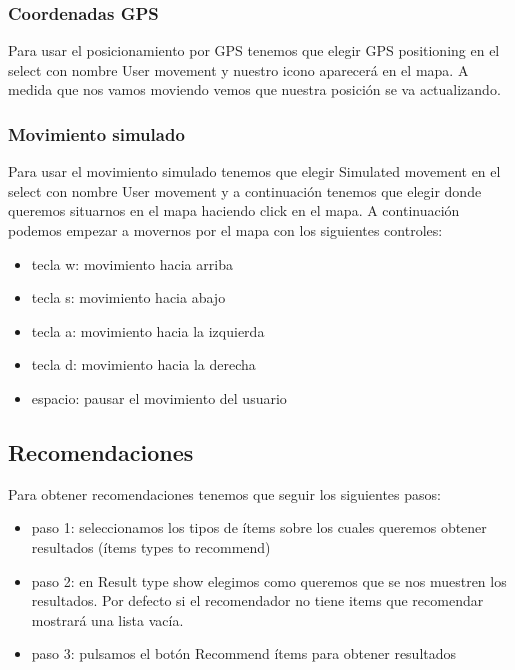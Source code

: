 \subsubsection{Coordenadas GPS}

Para usar el posicionamiento por GPS tenemos que elegir GPS positioning en el select con nombre User movement y nuestro icono aparecerá en el mapa. A medida que nos vamos moviendo vemos que nuestra posición se va actualizando.

\subsubsection{Movimiento simulado}

Para usar el movimiento simulado tenemos que elegir Simulated movement en el select con nombre User movement y a continuación tenemos que elegir donde queremos situarnos en el mapa haciendo click en el mapa. A continuación podemos empezar a movernos por el mapa con los siguientes controles:

\begin{itemize}
	\item tecla w: movimiento hacia arriba
	\item tecla s: movimiento hacia abajo
	\item tecla a: movimiento hacia la izquierda
	\item tecla d: movimiento hacia la derecha
	\item espacio: pausar el movimiento del usuario
\end{itemize}

\subsection{Recomendaciones}

Para obtener recomendaciones tenemos que seguir los siguientes pasos:

\begin{itemize}
	\item paso 1: seleccionamos los tipos de ítems sobre los cuales queremos obtener resultados (ítems types to recommend)
	\item paso 2: en Result type show elegimos como queremos que se nos muestren los resultados. Por defecto si el recomendador no tiene items que recomendar mostrará una lista vacía.
	\item paso 3: pulsamos el botón Recommend ítems para obtener resultados
\end{itemize}

